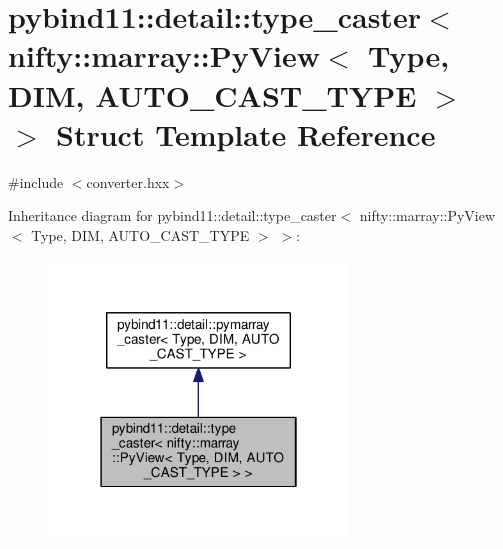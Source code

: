 \hypertarget{structpybind11_1_1detail_1_1type__caster_3_01nifty_1_1marray_1_1PyView_3_01Type_00_01DIM_00_01AUTO__CAST__TYPE_01_4_01_4}{}\section{pybind11\+:\+:detail\+:\+:type\+\_\+caster$<$ nifty\+:\+:marray\+:\+:Py\+View$<$ Type, D\+I\+M, A\+U\+T\+O\+\_\+\+C\+A\+S\+T\+\_\+\+T\+Y\+P\+E $>$ $>$ Struct Template Reference}
\label{structpybind11_1_1detail_1_1type__caster_3_01nifty_1_1marray_1_1PyView_3_01Type_00_01DIM_00_01AUTO__CAST__TYPE_01_4_01_4}


{\ttfamily \#include $<$converter.\+hxx$>$}



Inheritance diagram for pybind11\+:\+:detail\+:\+:type\+\_\+caster$<$ nifty\+:\+:marray\+:\+:Py\+View$<$ Type, D\+I\+M, A\+U\+T\+O\+\_\+\+C\+A\+S\+T\+\_\+\+T\+Y\+P\+E $>$ $>$\+:\nopagebreak
\begin{figure}[H]
\begin{center}
\leavevmode
\includegraphics[width=226pt]{structpybind11_1_1detail_1_1type__caster_3_01nifty_1_1marray_1_1PyView_3_01Type_00_01DIM_00_01AUb894e346011632bef1775f10f1a6e4df}
\end{center}
\end{figure}


